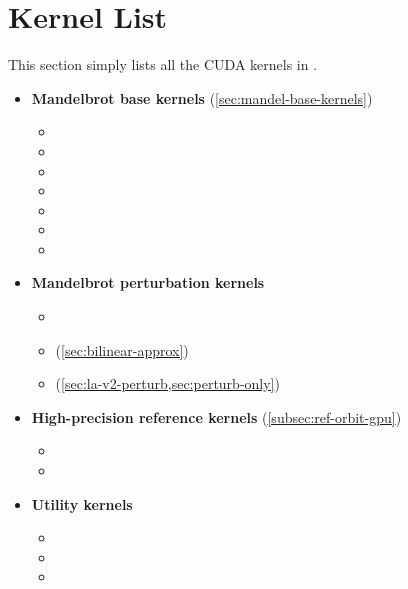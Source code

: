 \section{Kernel List}
\label{sec:kernel-list}

This section simply lists all the CUDA kernels in \FractalShark{}.

\begin{itemize}

\item \textbf{Mandelbrot base kernels} (\cref{sec:mandel-base-kernels})
  \begin{itemize}
    \item {}
    \item {}
    \item {}
    \item {}
    \item {}
    \item {}
    \item {}
  \end{itemize}

\item \textbf{Mandelbrot perturbation kernels}
  \begin{itemize}
    \item {}
    \item {} (\cref{sec:bilinear-approx})
    \item {} (\cref{sec:la-v2-perturb,sec:perturb-only})
  \end{itemize}

\item \textbf{High-precision reference kernels} (\cref{subsec:ref-orbit-gpu})
  \begin{itemize}
    \item {}
    \item {}
  \end{itemize}

\item \textbf{Utility kernels}
  \begin{itemize}
    \item {}
    \item {}
    \item {}
  \end{itemize}


\end{itemize}
